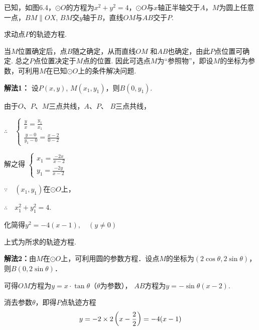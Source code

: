 \begin{example}
    已知，如图6.4，$\odot O$的方程为$x^2+y^2=4$，$\odot O$与$x$轴正半轴交于$A$，$M$为圆上任意一点，$BM\parallel OX$, $BM$交$y$轴于$B$，直线$OM$与$AB$交于$P$.

求动点$P$的轨迹方程.
\end{example}

\begin{analyze}
    当$M$位置确定后，点$B$随之确定，从而直线$OM$
    和$AB$也确定，由此$P$点位置可确定. 总之$P$点位置决定于$M$点的位置. 因此可选点$M$为“参照物”，即设$M$的坐标为参数，可利用$M$在已知$\odot O$上的条件解决问题.
\end{analyze}

\begin{solution}   
 \textbf{解法1：} 设$P(x,y)$, $M(x_1,y_1)$，则$B(0,y_1)$.

 \noindent
 \begin{minipage}{.5\textwidth}
 \CTEXindent
 
 由于$O$、$P$、$M$三点共线，$A$、$P$、
$B$三点共线，

$\therefore\quad \begin{cases}
   \frac{y}{x}= \frac{y_1}{x_1}\\[1.5ex]
   \frac{y-0}{y_1-0}=\frac{x-2}{0-2}
\end{cases}$

解之得
$\begin{cases}
    x_1=\frac{-2x}{x-2}\\[1.5ex] 
    y_1=\frac{-2y}{x-2}
\end{cases}$

$\because\quad (x_1,y_1)$在$\odot O$上，

$\therefore\quad x_1^2+y_1^2=4$.

化简得$y^2=-4(x-1),\quad (y\ne 0)$

上式为所求的轨迹方程.
 \end{minipage}\hfill
 \begin{minipage}{.47\textwidth}
     \centering
 \end{minipage}

\textbf{解法2：}由$M$在$\odot O$上，可利用圆的参数方程．设点$M$的坐标为$(2\cos\theta, 2\sin\theta)$，则$B(0,2\sin\theta)$．

可得$OM$方程为$y=x\cdot \tan\theta$（$\theta$为参数），
$AB$方程为$y=-\sin\theta (x-2)$.

消去参数$\theta$，即得$P$点轨迹方程
\[y=-2\times2 \left(x-\dfrac{2}{2}\right)=-4(x-1)\]
    
\end{solution} 

